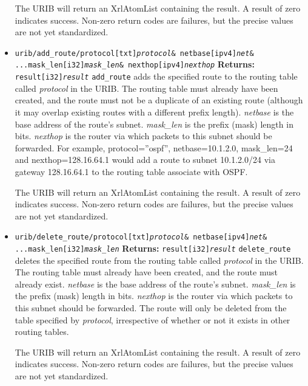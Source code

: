 \documentclass[11pt]{article}
\begin{document}
\begin{itemize}
The URIB will return an XrlAtomList containing the result.  A result
of zero indicates success.  Non-zero return codes are failures, but
the precise values are not yet standardized.

\item 
{\tt urib/add\_route/protocol[txt]{\it protocol}\& netbase[ipv4]{\it net}\&
\newline
...\hspace{0.25in}mask_len[i32]{\it mask_len}\& nexthop[ipv4]{\it nexthop}}
\newline
{\bf Returns:} {\tt result[i32]{\it result}}
\newline
{\tt add\_route} adds the specified route to the routing table called {\it
protocol} in the URIB.  The routing table must already have been
created, and the route must not be a duplicate of an existing route
(although it may overlap existing routes with a different prefix
length).  {\it netbase} is the base address of the route's subnet.
{\it mask_len} is the prefix (mask) length in bits.  {\it nexthop} is
the router via which packets to this subnet should be forwarded.  For
example, protocol=''ospf'', netbase=10.1.2.0, mask_len=24 and
nexthop=128.16.64.1 would add a route to subnet 10.1.2.0/24 via
gateway 128.16.64.1 to the routing table associate with OSPF.

The URIB will return an XrlAtomList containing the result.  A result
of zero indicates success.  Non-zero return codes are failures, but
the precise values are not yet standardized.

\item 
{\tt urib/delete\_route/protocol[txt]{\it protocol}\& netbase[ipv4]{\it net}\&
\newline
...\hspace{0.25in}mask_len[i32]{\it mask_len}}
\newline
{\bf Returns:} {\tt result[i32]{\it result}}
\newline
{\tt delete\_route} deletes the specified route from the routing table
called {\it protocol} in the URIB.  The routing table must already
have been created, and the route must already exist.  {\it netbase} is
the base address of the route's subnet.  {\it mask_len} is the prefix
(mask) length in bits.  {\it nexthop} is the router via which packets
to this subnet should be forwarded.  The route will only be deleted
from the table specified by {\it protocol}, irrespective of whether or
not it exists in other routing tables.

The URIB will return an XrlAtomList containing the result.  A result
of zero indicates success.  Non-zero return codes are failures, but
the precise values are not yet standardized.


\end{itemize}
\end{document}
